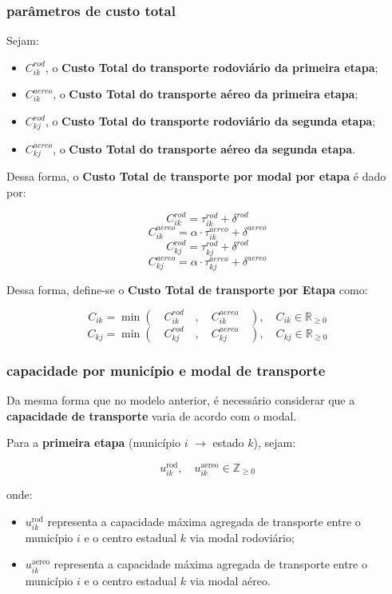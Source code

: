 \subsubsection{parâmetros de custo total}

Sejam:
\begin{itemize}
    \item $C_{ik}^{rod}$, o \textbf{Custo Total do transporte rodoviário da primeira etapa};
    \item $C_{ik}^{aereo}$, o \textbf{Custo Total do transporte aéreo  da primeira etapa};
    \item $C_{kj}^{rod}$, o \textbf{Custo Total do transporte rodoviário da segunda etapa};
    \item $C_{kj}^{aereo}$, o \textbf{Custo Total do transporte aéreo  da segunda etapa}.
\end{itemize}


Dessa forma, o \textbf{Custo Total de transporte por modal por etapa} é dado por:

\[
C_{ik}^{rod} = \tau_{ik}^{rod} + \delta^{rod}
\]
\[
C_{ik}^{aereo} = \alpha \cdot \tau_{ik}^{aereo} + \delta^{aereo}
\]
\[
C_{kj}^{rod} = \tau_{kj}^{rod} + \delta^{rod}
\]
\[
C_{kj}^{aereo} = \alpha \cdot \tau_{kj}^{aereo} + \delta^{aereo}
\]


Dessa forma, define-se o \textbf{Custo Total de transporte por Etapa} como:

\[
C_{ik} = \min \left( \quad C_{ik}^{rod} \quad , \quad C_{ik}^{aereo} \quad \right),  \quad C_{ik} \in \mathbb{R}_{\geq 0}
\]
\[
C_{kj} = \min \left( \quad C_{kj}^{rod} \quad , \quad C_{kj}^{aereo} \quad \right),  \quad C_{kj} \in \mathbb{R}_{\geq 0}
\]

\subsubsection{capacidade por município e modal de transporte}

Da mesma forma que no modelo anterior, é necessário considerar que a \textbf{capacidade de transporte} varia de acordo com o modal.

Para a \textbf{primeira etapa} (município $i$ $\rightarrow$ estado $k$), sejam:

\[
u_{ik}^{\text{rod}}, \quad u_{ik}^{\text{aereo}} \in \mathbb{Z}_{\ge 0}
\]

onde:
\begin{itemize}
    \item $u_{ik}^{\text{rod}}$ representa a capacidade máxima agregada de transporte entre o município $i$ e o centro estadual $k$ via modal rodoviário;
    \item $u_{ik}^{\text{aereo}}$ representa a capacidade máxima agregada de transporte entre o município $i$ e o centro estadual $k$ via modal aéreo.
\end{itemize}

